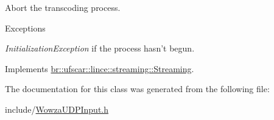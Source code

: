 Abort the transcoding process. 


\begin{DoxyExceptions}{Exceptions}
\item[{\em InitializationException}]if the process hasn't begun. \end{DoxyExceptions}


Implements \hyperlink{classbr_1_1ufscar_1_1lince_1_1streaming_1_1Streaming_a6fa79a5e9bac37069e91d77be9ef4a54}{br::ufscar::lince::streaming::Streaming}.



The documentation for this class was generated from the following file:\begin{DoxyCompactItemize}
\item 
include/\hyperlink{WowzaUDPInput_8h}{WowzaUDPInput.h}\end{DoxyCompactItemize}
